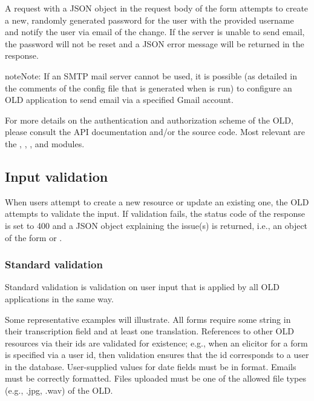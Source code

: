 \documentclass[letterpaper,10pt,english]{sphinxmanual}
\begin{document}
A  request with a JSON object in the request
body of the form  attempts to create a new, randomly
generated password for the user with the provided username and notify the user
via email of the change.  If the server is unable to send email, the password
will not be reset and a JSON error message will be returned in the response.

\begin{notice}{note}{Note:}
If an SMTP mail server cannot be used, it is possible (as detailed in the
comments of the config file that is generated when  is
run) to configure an OLD application to send email via a specified Gmail
account.
\end{notice}

For more details on the authentication and authorization scheme of the OLD,
please consult the API documentation and/or the source code.  Most relevant are
the , , ,
 and  modules.


\subsection{Input validation}
\label{interface:validation}\label{interface:input-validation}
When users attempt to create a new resource or update an existing one, the OLD
attempts to validate the input.  If validation fails, the status code of the
response is set to 400 and a JSON object explaining the issue(s) is returned,
i.e., an object of the form
 or
.


\subsubsection{Standard validation}
\label{interface:standard-validation}
Standard validation is validation on user input that is applied by all OLD
applications in the same way.

Some representative examples will illustrate.  All forms require some string in
their transcription field and at least one translation.  References to other OLD
resources via their ids are validated for existence; e.g., when an elicitor for
a form is specified via a user id, then validation ensures that the id
corresponds to a user in the database.  User-supplied values for date fields
must be in  format.  Emails must be correctly formatted.  Files
uploaded must be one of the allowed file types (e.g., .jpg, .wav) of the OLD.
\end{document}
